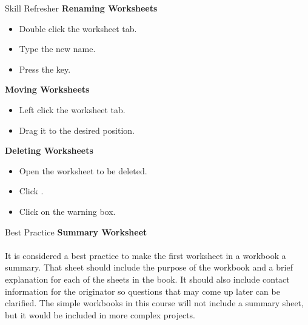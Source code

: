 \begin{center}
	\begin{sklbox}{Skill Refresher}
		\textbf{Renaming Worksheets}
		\\
		\begin{itemize}
			\setlength{\itemsep}{0pt}
			\setlength{\parskip}{0pt}
			\setlength{\parsep}{0pt}
			
			\item Double click the worksheet tab.
			\item Type the new name.
			\item Press the  key.
		\end{itemize}

		\hfill \break
		\textbf{Moving Worksheets}
		\\
		\begin{itemize}
			\setlength{\itemsep}{0pt}
			\setlength{\parskip}{0pt}
			\setlength{\parsep}{0pt}
			
			\item Left click the worksheet tab.
			\item Drag it to the desired position.
		\end{itemize}

		\hfill \break
		\textbf{Deleting Worksheets}
		\\
		\begin{itemize}
			\setlength{\itemsep}{0pt}
			\setlength{\parskip}{0pt}
			\setlength{\parsep}{0pt}
			
			\item Open the worksheet to be deleted.
			\item Click .
			\item Click  on the warning box.
		\end{itemize}

	\end{sklbox}
\end{center}

\begin{center}
	\begin{infobox}{Best Practice}
		\textbf{Summary Worksheet}
		\\
		\\
		It is considered a best practice to make the first worksheet in a workbook a summary. That sheet should include the purpose of the workbook and a brief explanation for each of the sheets in the book. It should also include contact information for the originator so questions that may come up later can be clarified. The simple workbooks in this course will not include a summary sheet, but it would be included in more complex projects.
	\end{infobox}
\end{center}


